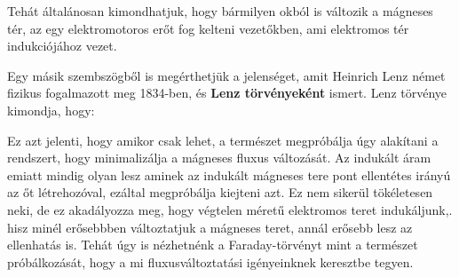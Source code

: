\documentclass[../main.tex]{subfiles}
\begin{document}
Tehát általánosan kimondhatjuk, hogy bármilyen okból is változik a mágneses tér, az egy elektromotoros erőt fog kelteni vezetőkben, ami elektromos tér indukciójához vezet.

Egy másik szembszögből is megérthetjük a jelenséget, amit Heinrich Lenz német fizikus fogalmazott meg 1834-ben, és \textbf{Lenz törvényeként} ismert. Lenz törvénye kimondja, hogy:
\begin{quote}
\end{quote}
Ez azt jelenti, hogy amikor csak lehet, a természet megpróbálja úgy alakítani a rendszert, hogy minimalizálja a mágneses fluxus változását. Az indukált áram emiatt mindig olyan lesz aminek az indukált mágneses tere pont ellentétes irányú az őt létrehozóval, ezáltal megpróbálja kiejteni azt. 
Ez nem sikerül tökéletesen neki, de ez akadályozza meg, hogy végtelen méretű elektromos teret indukáljunk,. hisz minél erősebbben változtatjuk a mágneses teret, annál erősebb lesz az ellenhatás is. Tehát úgy is nézhetnénk a Faraday-törvényt mint a természet próbálkozását, hogy a mi fluxusváltoztatási igényeinknek keresztbe tegyen.
\end{document}
